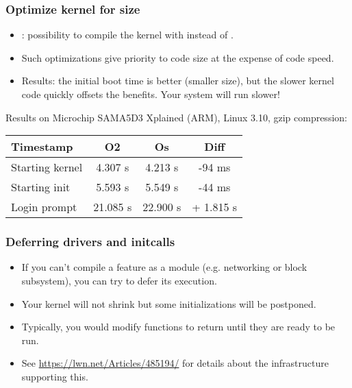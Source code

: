 \begin{frame}
\frametitle{Optimize kernel for size}
\begin{itemize}
\item {}: possibility to compile the kernel
      with  instead of .
\item Such optimizations give priority to code size at
      the expense of code speed.
\item Results: the initial boot time is better (smaller
      size), but the slower kernel code quickly offsets
      the benefits. Your system will run slower!
\end{itemize}
Results on Microchip SAMA5D3 Xplained (ARM), Linux 3.10, gzip compression:
\newline\newline
\begin{tabular}{| l || c | c | c |}
\hline
Timestamp & O2 & Os & Diff \\
\hline
Starting kernel & 4.307 s & 4.213 s & -94 ms \\
Starting init & 5.593 s & 5.549 s & -44 ms \\
Login prompt & 21.085 s & 22.900 s & + 1.815 s \\
\hline
\end{tabular}
\newline\newline
\small
\end{frame}

\begin{frame}
\frametitle{Deferring drivers and initcalls}
\begin{itemize}
\item If you can't compile a feature as a module (e.g. networking or block
      subsystem), you can try to defer its execution.
\item Your kernel will not shrink but some initializations will be
      postponed.
\item Typically, you would modify  functions to return
      \code{-} until they are ready to be run.
\item See \url{https://lwn.net/Articles/485194/} for details about the
      infrastructure supporting this.
\end{itemize}
\end{frame}

